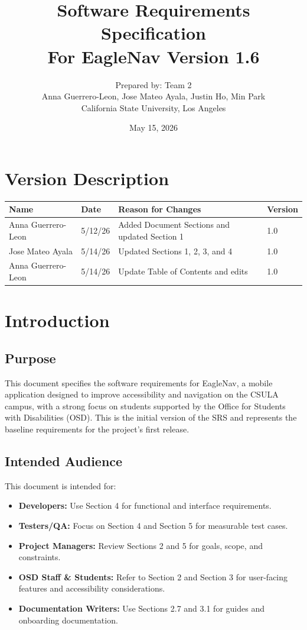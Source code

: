 \documentclass[12pt]{article}
\title{\textbf{Software Requirements Specification} \\ For EagleNav Version 1.6}
\author{Prepared by: Team 2 \\
Anna Guerrero-Leon, Jose Mateo Ayala, Justin Ho, Min Park \\
California State University, Los Angeles}
\date{May 15, 2026}
\begin{document}
\maketitle
\newpage

\tableofcontents
\newpage

\section*{Version Description}
\begin{tabularx}{\textwidth}{|l|l|X|l|}
\hline
\textbf{Name} & \textbf{Date} & \textbf{Reason for Changes} & \textbf{Version} \\
\hline
Anna Guerrero-Leon & 5/12/26 & Added Document Sections and updated Section 1 & 1.0 \\
\hline
Jose Mateo Ayala & 5/14/26 & Updated Sections 1, 2, 3, and 4 & 1.0 \\
\hline
Anna Guerrero-Leon & 5/14/26 & Update Table of Contents and edits & 1.0 \\
\hline
\end{tabularx}

\newpage

\section{Introduction}

\subsection{Purpose}

This document specifies the software requirements for EagleNav, a mobile application designed to improve accessibility and navigation on the CSULA campus, with a strong focus on students supported by the Office for Students with Disabilities (OSD). This is the initial version of the SRS and represents the baseline requirements for the project's first release.

\subsection{Intended Audience}

This document is intended for:

\begin{itemize}
    \item \textbf{Developers:} Use Section 4 for functional and interface requirements.
    \item \textbf{Testers/QA:} Focus on Section 4 and Section 5 for measurable test cases.
    \item \textbf{Project Managers:} Review Sections 2 and 5 for goals, scope, and constraints.
    \item \textbf{OSD Staff \& Students:} Refer to Section 2 and Section 3 for user-facing features and accessibility considerations.
    \item \textbf{Documentation Writers:} Use Sections 2.7 and 3.1 for guides and onboarding documentation.
\end{itemize}
\end{document}

